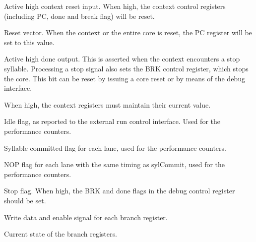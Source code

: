 
\contextInterface{}

\ifaceSubGroup{}
Active high context reset input. When high, the context control registers 
(including PC, done and break flag) will be reset.
    
\ifaceSubGroup{}
Reset vector. When the context or the entire core is reset, the PC register will 
be set to this value.
    
\ifaceSubGroup{}
Active high done output. This is asserted when the context encounters a stop 
syllable. Processing a stop signal also sets the BRK control register, which 
stops the core. This bit can be reset by issuing a core reset or by means of the 
debug interface.

\ifaceSubGroup{}
When high, the context registers must maintain their current value.

\ifaceSubGroup{}
Idle flag, as reported to the external run control interface. Used for the 
performance counters.

\ifaceSubGroup{}
Syllable committed flag for each lane, used for the performance counters.
    
\ifaceSubGroup{}
NOP flag for each lane with the same timing as sylCommit, used for the 
performance counters.

\ifaceSubGroup{}
Stop flag. When high, the BRK and done flags in the debug control
register should be set.
    
\ifaceSubGroup{}
Write data and enable signal for each branch register.
    
\ifaceSubGroup{}
Current state of the branch registers.
    
